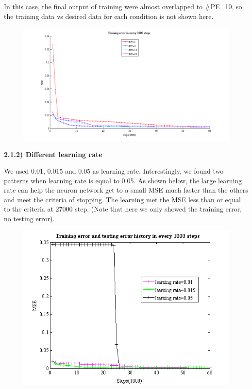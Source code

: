 \documentclass[epsfig]{article}
\def\bpar{\vskip26pt}
\def\npar{\vskip13pt}
\begin{document}
In this case, the final output of training were almost overlapped to $\#$PE=10, so the training data vs desired data for each condition is not shown here.

\begin{figure}[H] 
\centering\includegraphics[width=6.5in]{errPE.png} 
\end{figure} 



{\bf 
\npar
2.1.2) Different learning rate 
\bpar
}

We used 0.01, 0.015 and 0.05 as learning rate. Interestingly, we found two patterns when learning rate is equal to 0.05. As shown below, the large learning rate can help the neuron network get to a small MSE much faster than the others and meet the criteria of stopping. The learning met the MSE less than or equal to the criteria at 27000 step. (Note that here we only showed the training error, no testing error).

\begin{figure}[H] 
\centering\includegraphics[width=4.5in]{lr_err1.png} 
\end{figure} 
\end{document}
